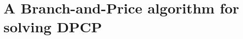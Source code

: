 \documentclass[preprint, 11pt, authoryear]{elsarticle}
\newtheorem{remark}{Remark}[section]
\newcommand{\II}[1]{\mathcal I(#1)}
\newcommand{\newproblem}{\text{DPCP}}
\begin{document}
\section{A Branch-and-Price algorithm for solving DPCP}
\label{sec:branch-and-price-algo}



\end{document}
